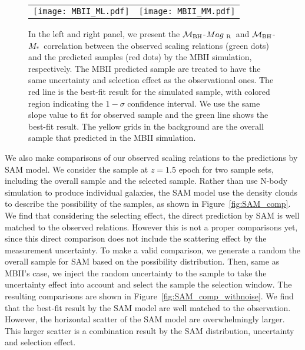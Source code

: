 \documentclass{natureprintstyle}
\newcommand{\mbh}{$\mathcal M_{\rm BH}$}
\newcommand{\mr}{$Mag_{\rm ~R}$}
\newcommand{\mstar}{{$M_*$}}
\newcommand{\ding}[1]{\textcolor{red}{[{\bf Xuheng}: #1]}}
\begin{document}
\begin{figure*}[t]%
\begin{tabular}{c c}
\texttt{[image: MBII\_ML.pdf]} &
\texttt{[image: MBII\_MM.pdf]} \\
\end{tabular}
\caption{  In the left and right panel, we present the \mbh-\mr\ and \mbh-\mstar\ correlation between the observed scaling relations (green dots) and the predicted samples (red dots) by the MBII simulation, respectively. The MBII predicted sample are treated to have the same uncertainty and selection effect as the observational ones. The red line is the best-fit result for the simulated sample, with colored region indicating the $1-\sigma$ confidence interval. We use the same slope value to fit for observed sample and the green line shows the best-fit result. The yellow grids in the background are the overall sample that predicted in the MBII simulation.  %
}
\label{fig:MBII_comp}
\end{figure*}

We also make comparisons of our observed scaling relations to the predictions by SAM model. We consider the sample at $z=1.5$ epoch for two sample sets, including the overall sample and the selected sample. Rather than use N-body simulation to produce individual galaxies, the SAM model use the density clouds to describe the possibility of the samples, as shown in Figure~\ref{fig:SAM_comp}. We find that considering the selecting effect, the direct prediction by SAM is well matched to the observed relations.
However this is not a proper comparisons yet, since this direct comparison does not include the scattering effect by the measurement uncertainty. To make a valid comparison, we generate a random the overall sample for SAM based on the possibility distribution. Then, same as MBII's case, we inject the random uncertainty to the sample to take the uncertainty effect into account and select the sample the selection window. The resulting comparisons are shown in Figure~\ref{fig:SAM_comp_withnoise}. We find that the best-fit result by the SAM model are well matched to the observation. However, the horizontal scatter of the SAM model are overwhelmingly larger. This larger scatter is a combination result by the SAM distribution, uncertainty and selection effect.  
\end{document}
